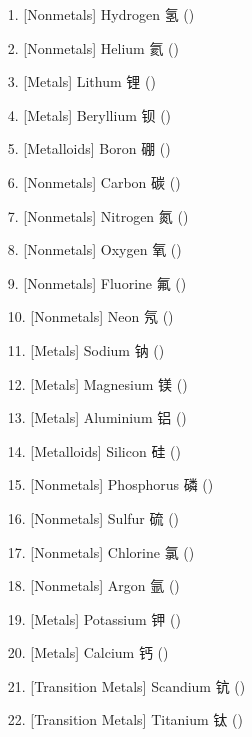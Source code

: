 \begin{itemize}
    \begin{itemize}
        \item[1.]       [Nonmetals]             Hydrogen        氢  ()
        \item[2.]       [Nonmetals]             Helium          氦  ()
        \item[3.]       [Metals]                Lithum          锂  ()
        \item[4.]       [Metals]                Beryllium       钡  ()
        \item[5.]       [Metalloids]            Boron           硼  ()
        \item[6.]       [Nonmetals]             Carbon          碳  ()
        \item[7.]       [Nonmetals]             Nitrogen        氮  ()
        \item[8.]       [Nonmetals]             Oxygen          氧  () 
        \item[9.]       [Nonmetals]             Fluorine        氟  ()
        \item[10.]      [Nonmetals]             Neon            氖  ()
        \item[11.]      [Metals]                Sodium          钠  ()
        \item[12.]      [Metals]                Magnesium       镁  ()
        \item[13.]      [Metals]                Aluminium       铝  ()
        \item[14.]      [Metalloids]            Silicon         硅  ()
        \item[15.]      [Nonmetals]             Phosphorus      磷  ()
        \item[16.]      [Nonmetals]             Sulfur          硫  () 
        \item[17.]      [Nonmetals]             Chlorine        氯  ()
        \item[18.]      [Nonmetals]             Argon           氩  ()
        \item[19.]      [Metals]                Potassium       钾  ()
        \item[20.]      [Metals]                Calcium         钙  ()
        \item[21.]      [Transition Metals]     Scandium        钪  ()
        \item[22.]      [Transition Metals]     Titanium        钛  ()

\end{itemize}
\end{itemize}
